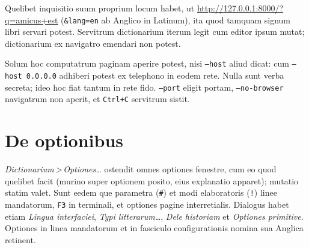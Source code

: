 \documentclass[12pt,
              article,
              oneside
              ]{memoir}
\newcommand*{\menu}[1]{\textit{#1}}
\newcommand*{\then}{\,>\,}
\newcommand*{\key}[1]{\texttt{#1}}
\begin{document}
%
Quelibet inquisitio suum proprium locum habet, ut
\url{http://127.0.0.1:8000/?q=amicus+est} (\texttt{\&lang=en} ab Anglico
in Latinum), ita quod tamquam signum libri servari potest. Servitrum
dictionarium iterum legit cum editor ipsum mutat; dictionarium ex
navigatro emendari non potest.

%
Solum hoc computatrum paginam aperire potest, nisi \texttt{--host} aliud
dicat: cum \texttt{--host 0.0.0.0} adhiberi potest ex telephono in eodem
rete. Nulla sunt verba secreta; ideo hoc fiat tantum in rete fido.
\texttt{--port} eligit portam, \texttt{--no-browser} navigatrum non
aperit, et \key{Ctrl+C} servitrum sistit.

\section{De optionibus}
\label{sec:settings}

%
\menu{Dictionarium\then Optiones\ldots} ostendit omnes optiones fenestre,
cum eo quod quelibet facit (murino super optionem posito, eius explanatio
apparet); mutatio statim valet. Sunt eedem que parametra (\texttt{\#}) et
modi elaboratoris (\texttt{!}) linee mandatorum, \key{F3} in terminali, et
optiones pagine interretialis. Dialogus habet etiam \menu{Lingua
interfaciei}, \menu{Typi litterarum\ldots}, \menu{Dele historiam} et \menu{Optiones
primitive}. Optiones in linea mandatorum et in fasciculo configurationis
nomina sua Anglica retinent.
\end{document}

